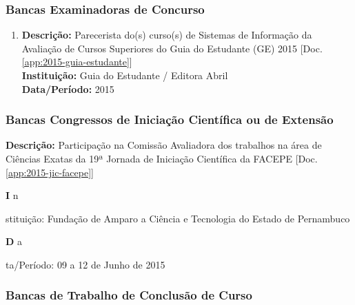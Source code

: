 \documentclass[a4paper,oneside,12pt]{article}
\newcommand{\SubItemB}[2]{
    {\setlength\itemindent{15pt} \item[-] \textbf{#1} {#2}}}
\begin{document}
\subsubsection{Bancas Examinadoras de Concurso}
\vspace{0.3cm}

\begin{enumerate}
\renewcommand{\labelenumi}{{\large\bfseries\arabic{enumi}.}}
\vspace{0.3cm}

\item       \textbf{Descrição:} Parecerista do(s) curso(s) de Sistemas de Informação da Avaliação de Cursos Superiores do Guia do Estudante (GE) 2015 [Doc. \ref{app:2015-guia-estudante}]\\
            \textbf{Instituição:} Guia do Estudante / Editora Abril \\
            \textbf{Data/Período:} 2015 %

\end{enumerate}


\subsubsection{Bancas Congressos de Iniciação Científica ou de Extensão}
\vspace{0.3cm}

\begin{enumerate}
\renewcommand{\labelenumi}{{\large\bfseries\arabic{enumi}.}}
\vspace{0.3cm}

\item   \textbf{Descrição:}  Participação na Comissão Avaliadora dos trabalhos na área de Ciências Exatas da 19ª Jornada de Iniciação Científica da FACEPE [Doc. \ref{app:2015-jic-facepe}]
    \SubItemB  Instituição: Fundação de Amparo a Ciência e Tecnologia do Estado de Pernambuco 
     \SubItemB Data/Período: 09 a 12 de Junho de 2015
\end{enumerate}


\subsubsection{Bancas de Trabalho de Conclusão de Curso}
\vspace{0.3cm}
\end{document}
